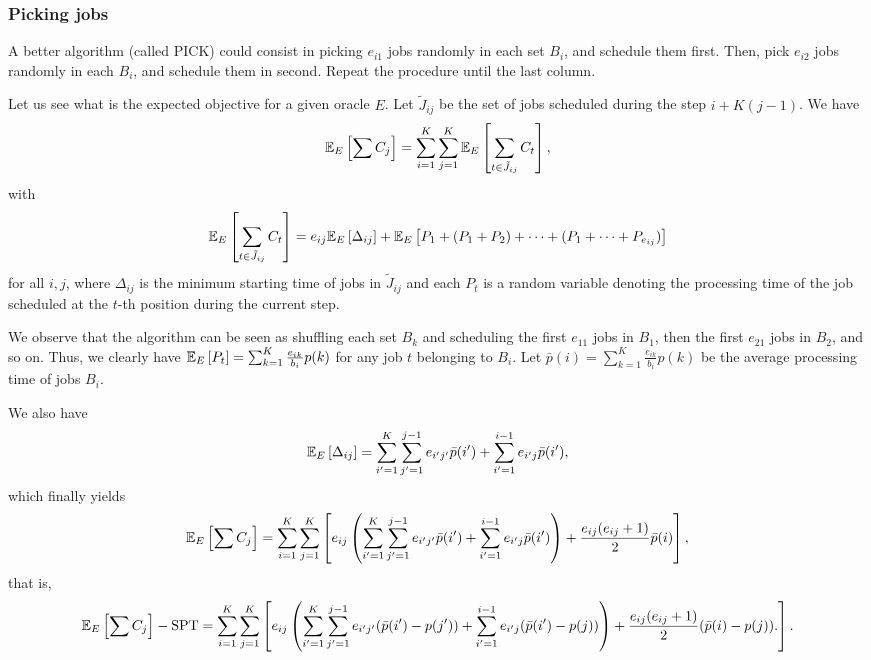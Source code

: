 \documentclass{article}
\begin{document}

\subsubsection{Picking jobs}

A better algorithm (called PICK) could consist in picking \(e_{i1}\) jobs randomly in each set \(B_i\), and schedule them first.
Then, pick \(e_{i2}\) jobs randomly in each \(B_i\), and schedule them in second. Repeat the procedure until the last column.



Let us see what is the expected objective for a given oracle \(E\).
Let \(\tilde{J}_{ij}\) be the set of jobs scheduled during the step \(i+K(j-1)\).
We have
\[
    \mathbb{E}_E\left[\sum C_j\right]=\sum_{i=1}^K \sum_{j=1}^K \mathbb{E}_E\left[\sum_{t\in \tilde{J}_{ij}} C_t\right],
\]
with
\[
    \mathbb{E}_E\left[\sum_{t\in \tilde{J}_{ij}} C_t\right]=
        e_{ij}\mathbb{E}_E\left[\Delta_{ij}\right]+\mathbb{E}_E\left[P_1+(P_1+P_2)+\dots+(P_1+\dots+P_{e_{ij}})\right]
\]
for all \(i,j\), where \(\Delta_{ij}\) is the minimum starting time of jobs in \(\tilde{J}_{ij}\) and each \(P_t\) is a random variable denoting the processing time of the job scheduled at the \(t\)-th position during the current step.

We observe that the algorithm can be seen as shuffling each set \(B_k\) and scheduling the first \(e_{11}\) jobs in \(B_1\), then the first \(e_{21}\) jobs in \(B_2\), and so on.
Thus, we clearly have \(\mathbb{E}_E\left[P_t\right]=\sum_{k=1}^K \frac{e_{ik}}{b_i}p(k)\) for any job \(t\) belonging to \(B_i\).
Let \(\bar{p}(i)=\sum_{k=1}^K \frac{e_{ik}}{b_i}p(k)\) be the average processing time of jobs \(B_i\).

We also have
\[
    \mathbb{E}_E\left[\Delta_{ij}\right]=
        \sum_{i'=1}^K \sum_{j'=1}^{j-1} e_{i'j'} \bar{p}(i')
        + \sum_{i'=1}^{i-1} e_{i'j} \bar{p}(i'),
\]
which finally yields
\[
    \mathbb{E}_E\left[\sum C_j\right]=
        \sum_{i=1}^K \sum_{j=1}^K\left[
            e_{ij}\left(\sum_{i'=1}^K \sum_{j'=1}^{j-1} e_{i'j'} \bar{p}(i')
                + \sum_{i'=1}^{i-1} e_{i'j} \bar{p}(i')\right) +
            \frac{e_{ij}(e_{ij}+1)}{2}\bar{p}(i)
        \right],
\]
that is,
\[
    \mathbb{E}_E\left[\sum C_j\right]-\text{SPT}=
        \sum_{i=1}^K \sum_{j=1}^K\left[
            e_{ij}\left(\sum_{i'=1}^K \sum_{j'=1}^{j-1} e_{i'j'} (\bar{p}(i')-p(j'))
                + \sum_{i'=1}^{i-1} e_{i'j} (\bar{p}(i')-p(j))\right) +
            \frac{e_{ij}(e_{ij}+1)}{2}(\bar{p}(i)-p(j)).
        \right].
\]
\end{document}
